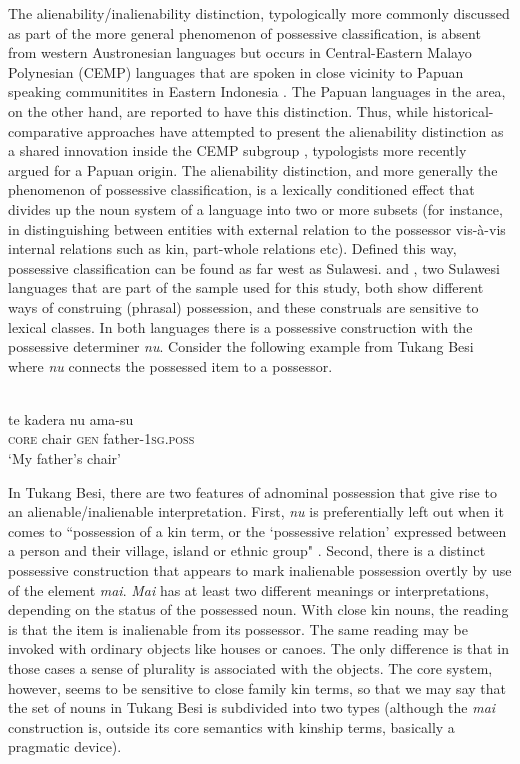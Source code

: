 The alienability/inalienability distinction, typologically more commonly discussed as part of the more general phenomenon of possessive classification, is absent from western Austronesian languages but occurs in Central-Eastern Malayo Polynesian (CEMP) languages that are spoken in close vicinity to Papuan speaking communitites in Eastern Indonesia \citep[116]{klamer2008east}. The Papuan languages in the area, on the other hand, are reported to have this distinction. Thus, while historical-comparative approaches have attempted to present the alienability distinction as a shared innovation inside the CEMP subgroup \citep{blust1993central}, typologists more recently argued for a Papuan origin. The alienability distinction, and more generally the phenomenon of possessive classification, is a lexically conditioned effect that divides up the noun system of a language into two or more subsets (for instance, in distinguishing between entities with external relation to the possessor vis-à-vis internal relations such as kin, part-whole relations etc). Defined this way, possessive classification can be found as far west as Sulawesi.  and , two Sulawesi languages that are part of the sample used for this study, both show different ways of construing (phrasal) possession, and these construals are sensitive to lexical classes. In both languages there is a possessive construction with the possessive determiner \textit{nu}. Consider the following example from Tukang Besi where \textit{nu} connects the possessed item to a possessor.

\ea 
{}\\
\gll te kadera nu ama-su\\
\textsc{core} chair \textsc{gen} father-\textsc{1}\textsc{sg}.\textsc{poss}\\
\glt ‘My father's chair’
\z

In Tukang Besi, there are two features of adnominal possession that give rise to an alienable/inalienable interpretation. First, \textit{nu} is preferentially left out when it comes to ``possession of a kin term, or the `possessive relation' expressed between a person and their village, island or ethnic group" \citep[346]{donohue1999}. Second, there is a distinct possessive construction that appears to mark inalienable possession overtly by use of the element \textit{mai}. \textit{Mai} has at least two different meanings or interpretations, depending on the status of the possessed noun. With close kin nouns, the reading is that the item is inalienable from its possessor. The same reading may be invoked with ordinary objects like houses or canoes. The only difference is that in those cases a sense of plurality is associated with the objects. The core system, however, seems to be sensitive to close family kin terms, so that we may say that the set of nouns in Tukang Besi is subdivided into two types (although the \textit{mai} construction is, outside its core semantics with kinship terms, basically a pragmatic device). 

